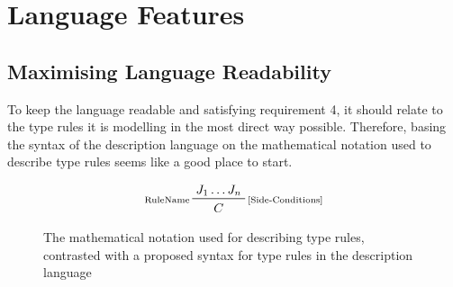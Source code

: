 \documentclass{UoYCSproject}
\begin{document}
\section{Language Features}

\subsection{Maximising Language Readability}
To keep the language readable and satisfying requirement 4, it should relate to 
the type rules it is modelling in the most direct way possible. Therefore, 
basing the syntax of the description language on the mathematical notation used 
to describe type rules seems like a good place to start.

\begin{figure}[!ht]
    \begin{minipage}[b]{.55\textwidth}
        \begin{displaymath}
    \prftree[l,r]{\scriptsize [Side-Conditions]}{\scriptsize RuleName}{
        J_1 \dots J_n}{C}
        \end{displaymath}
        \label{fig:TypicalTypeRule}
    \end{minipage}
    \begin{minipage}[b]{.45\textwidth}
    \lstset{basicstyle=\footnotesize\ttfamily, frame=single,
        language=,}
    
        \label{fig:ProposedSyntax}
    \end{minipage}
    \caption{The mathematical notation used for describing type rules, contrasted
        with a proposed syntax for type rules in the description language}
    \label{fig:RuleLanguageContrast}
\end{figure}
\end{document}

